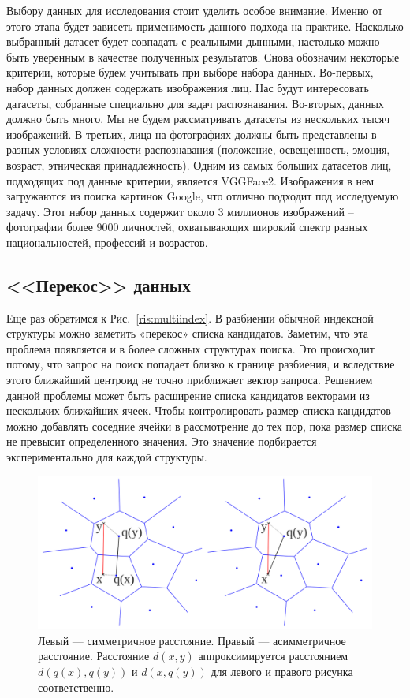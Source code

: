Выбору данных для исследования стоит уделить особое внимание. Именно от этого этапа будет зависеть применимость данного подхода на практике. Насколько выбранный датасет будет совпадать с реальными дынными, настолько можно быть уверенным в качестве полученных результатов. Снова обозначим некоторые критерии, которые будем учитывать при выборе набора данных. Во-первых, набор данных должен содержать изображения лиц. Нас будут интересовать датасеты, собранные специально для задач распознавания. Во-вторых, данных должно быть много. Мы не будем рассматривать датасеты из нескольких тысяч изображений. В-третьих, лица на фотографиях должны быть представлены в разных условиях сложности распознавания (положение, освещенность, эмоция, возраст, этническая принадлежность). Одним из самых больших датасетов лиц, подходящих под данные критерии, является VGGFace2. Изображения в нем загружаются из поиска картинок Google, что отлично подходит под исследуемую задачу. Этот набор данных содержит около 3 миллионов изображений -- фотографии более 9000 личностей, охватывающих широкий спектр разных национальностей, профессий и возрастов.

\subsection{<<Перекос>> данных}

Еще раз обратимся к Рис.~\ref{ris:multiindex}. В разбиении обычной индексной структуры можно заметить «перекос» списка кандидатов. Заметим, что эта проблема появляется и в более сложных структурах поиска. Это происходит потому, что запрос на поиск попадает близко к границе разбиения, и вследствие этого ближайший центроид не точно приближает вектор запроса. Решением данной проблемы может быть расширение списка кандидатов векторами из нескольких ближайших ячеек. Чтобы контролировать размер списка кандидатов можно добавлять соседние ячейки в рассмотрение до тех пор, пока размер списка не превысит определенного значения. Это значение подбирается экспериментально для каждой структуры.

\begin{figure}[h]
\includegraphics[width=1\linewidth]{Images/ADC_SDC.png}
\caption{Левый — симметричное расстояние. Правый — асимметричное расстояние. Расстояние $d(x,y)$ аппроксимируется расстоянием $d(q(x), q(y))$ и $d(x, q(y))$ для левого и правого рисунка соответственно.}
\label{ris:adc}
\end{figure}

